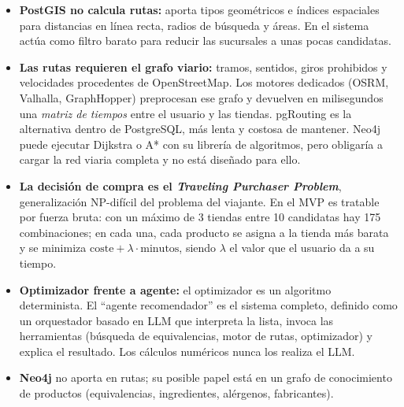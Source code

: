 \begin{tcolorbox}[colback=responsecolor, title=Insights de Claude, colframe=gray!60!black, breakable]
	\begin{itemize}
		\item \textbf{PostGIS no calcula rutas:} aporta tipos geométricos e índices espaciales para distancias en línea recta, radios de búsqueda y áreas. En el sistema actúa como filtro barato para reducir las sucursales a unas pocas candidatas.

		\item \textbf{Las rutas requieren el grafo viario:} tramos, sentidos, giros prohibidos y velocidades procedentes de OpenStreetMap. Los motores dedicados (OSRM, Valhalla, GraphHopper) preprocesan ese grafo y devuelven en milisegundos una \textit{matriz de tiempos} entre el usuario y las tiendas. pgRouting es la alternativa dentro de PostgreSQL, más lenta y costosa de mantener. Neo4j puede ejecutar Dijkstra o A* con su librería de algoritmos, pero obligaría a cargar la red viaria completa y no está diseñado para ello.

		\item \textbf{La decisión de compra es el \textit{Traveling Purchaser Problem}}, generalización NP-difícil del problema del viajante. En el MVP es tratable por fuerza bruta: con un máximo de 3 tiendas entre 10 candidatas hay 175 combinaciones; en cada una, cada producto se asigna a la tienda más barata y se minimiza $\mathrm{coste} + \lambda \cdot \mathrm{minutos}$, siendo $\lambda$ el valor que el usuario da a su tiempo.

		\item \textbf{Optimizador frente a agente:} el optimizador es un algoritmo determinista. El ``agente recomendador'' es el sistema completo, definido como un orquestador basado en LLM que interpreta la lista, invoca las herramientas (búsqueda de equivalencias, motor de rutas, optimizador) y explica el resultado. Los cálculos numéricos nunca los realiza el LLM.

		\item \textbf{Neo4j} no aporta en rutas; su posible papel está en un grafo de conocimiento de productos (equivalencias, ingredientes, alérgenos, fabricantes).
	\end{itemize}
\end{tcolorbox}

